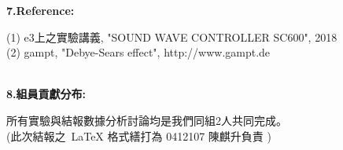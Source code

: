 \documentclass[UTF8]{ctexart}
\begin{document}
\begin{CJK*}{UTF8}{song}
\newpage

\begin{large}
\textbf{7.Reference: } \\
\end{large}
(1) e3上之實驗講義, "SOUND WAVE CONTROLLER SC600", 2018 \\
(2) gampt, "Debye-Sears effect",  http://www.gampt.de \\
 \\


\begin{large}
\textbf{8.組員貢獻分布: } \\
\end{large}
所有實驗與結報數據分析討論均是我們同組2人共同完成。 \\
(此次結報之~\LaTeX{} 格式繕打為 0412107 陳麒升負責 )


\end{CJK*}
\end{document}
